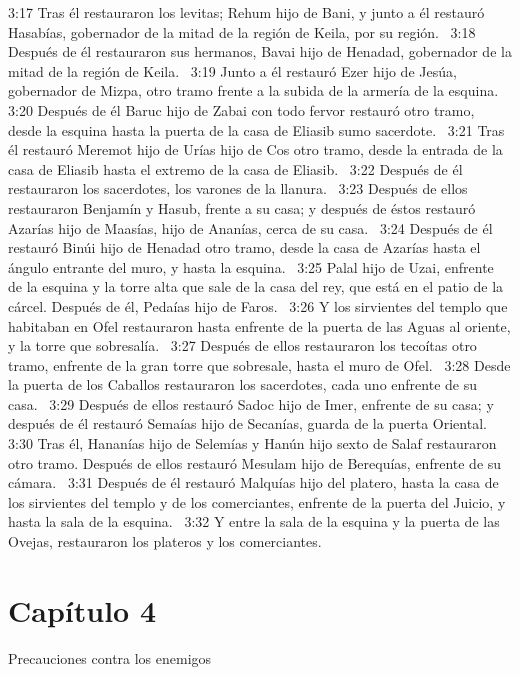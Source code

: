 3:17 Tras él restauraron los levitas; Rehum hijo de Bani, y junto a él restauró Hasabías, gobernador de la mitad de la región de Keila, por su región.  
3:18 Después de él restauraron sus hermanos, Bavai hijo de Henadad, gobernador de la mitad de la región de Keila.  
3:19 Junto a él restauró Ezer hijo de Jesúa, gobernador de Mizpa, otro tramo frente a la subida de la armería de la esquina.  
3:20 Después de él Baruc hijo de Zabai con todo fervor restauró otro tramo, desde la esquina hasta la puerta de la casa de Eliasib sumo sacerdote.  
3:21 Tras él restauró Meremot hijo de Urías hijo de Cos otro tramo, desde la entrada de la casa de Eliasib hasta el extremo de la casa de Eliasib.  
3:22 Después de él restauraron los sacerdotes, los varones de la llanura.  
3:23 Después de ellos restauraron Benjamín y Hasub, frente a su casa; y después de éstos restauró Azarías hijo de Maasías, hijo de Ananías, cerca de su casa.  
3:24 Después de él restauró Binúi hijo de Henadad otro tramo, desde la casa de Azarías hasta el ángulo entrante del muro, y hasta la esquina.  
3:25 Palal hijo de Uzai, enfrente de la esquina y la torre alta que sale de la casa del rey, que está en el patio de la cárcel. Después de él, Pedaías hijo de Faros.  
3:26 Y los sirvientes del templo que habitaban en Ofel restauraron hasta enfrente de la puerta de las Aguas al oriente, y la torre que sobresalía.  
3:27 Después de ellos restauraron los tecoítas otro tramo, enfrente de la gran torre que sobresale, hasta el muro de Ofel.  
3:28 Desde la puerta de los Caballos restauraron los sacerdotes, cada uno enfrente de su casa.  
3:29 Después de ellos restauró Sadoc hijo de Imer, enfrente de su casa; y después de él restauró Semaías hijo de Secanías, guarda de la puerta Oriental.  
3:30 Tras él, Hananías hijo de Selemías y Hanún hijo sexto de Salaf restauraron otro tramo. Después de ellos restauró Mesulam hijo de Berequías, enfrente de su cámara.  
3:31 Después de él restauró Malquías hijo del platero, hasta la casa de los sirvientes del templo y de los comerciantes, enfrente de la puerta del Juicio, y hasta la sala de la esquina.  
3:32 Y entre la sala de la esquina y la puerta de las Ovejas, restauraron los plateros y los comerciantes.  
\section*{Capítulo 4}
Precauciones contra los enemigos


